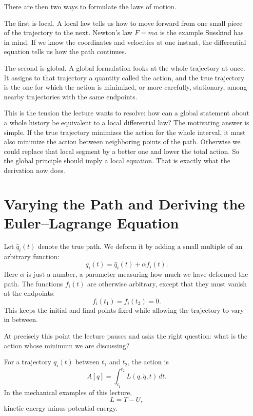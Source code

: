 There are then two ways to formulate the laws of motion.

The first is local. A local law tells us how to move forward from one small piece of the trajectory to the next. Newton's law \(F=ma\) is the example Susskind has in mind. If we know the coordinates and velocities at one instant, the differential equation tells us how the path continues.

The second is global. A global formulation looks at the whole trajectory at once. It assigns to that trajectory a quantity called the action, and the true trajectory is the one for which the action is minimized, or more carefully, stationary, among nearby trajectories with the same endpoints.

This is the tension the lecture wants to resolve: how can a global statement about a whole history be equivalent to a local differential law? The motivating answer is simple. If the true trajectory minimizes the action for the whole interval, it must also minimize the action between neighboring points of the path. Otherwise we could replace that local segment by a better one and lower the total action. So the global principle should imply a local equation. That is exactly what the derivation now does.

\section{Varying the Path and Deriving the Euler--Lagrange Equation}

Let \(\hat q_i(t)\) denote the true path. We deform it by adding a small multiple of an arbitrary function:
\begin{equation}
q_i(t)=\hat q_i(t)+\alpha f_i(t).
\end{equation}
Here \(\alpha\) is just a number, a parameter measuring how much we have deformed the path. The functions \(f_i(t)\) are otherwise arbitrary, except that they must vanish at the endpoints:
\begin{equation}
f_i(t_1)=f_i(t_2)=0.
\end{equation}
This keeps the initial and final points fixed while allowing the trajectory to vary in between.

At precisely this point the lecture pauses and asks the right question: what is the action whose minimum we are discussing?

\begin{definition}
For a trajectory \(q_i(t)\) between \(t_1\) and \(t_2\), the action is
\begin{equation}
A[q]=\int_{t_1}^{t_2}L(q,\dot q,t)\,dt.
\end{equation}
In the mechanical examples of this lecture,
\begin{equation}
L=T-U,
\end{equation}
kinetic energy minus potential energy.
\end{definition}

